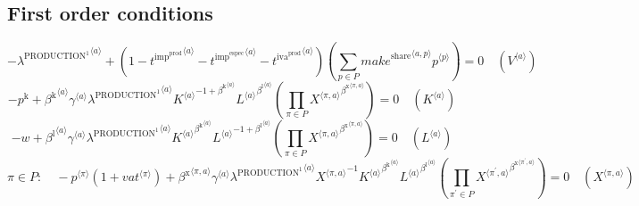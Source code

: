 \subsection{First order conditions}

\begin{equation}
-{\lambda^{\mathrm{PRODUCTION}^{\mathrm{1}}}}^{\langle a\rangle} + \left(1 - {t^{\mathrm{imp}^{\mathrm{prod}}}}^{\langle a\rangle} - {t^{\mathrm{imp}^{\mathrm{espec}}}}^{\langle a\rangle} - {t^{\mathrm{iva}^{\mathrm{prod}}}}^{\langle a\rangle}\right) \left(\sum_{p\in P} {{{m\!a\!k\!e}^{\mathrm{share}}}^{\langle a,p\rangle}} {{p}^{\langle p\rangle}}\right) = 0
 \quad \left({V}^{\langle a\rangle}\right)
\end{equation}
\begin{equation}
-p^{\mathrm{k}} + {{\beta^{\mathrm{k}}}^{\langle a\rangle}} {{\gamma}^{\langle a\rangle}} {{\lambda^{\mathrm{PRODUCTION}^{\mathrm{1}}}}^{\langle a\rangle}} {{{K}^{\langle a\rangle}}^{-1 + {\beta^{\mathrm{k}}}^{\langle a\rangle}}} {{{L}^{\langle a\rangle}}^{{\beta^{\mathrm{l}}}^{\langle a\rangle}}} \left(\prod_{\pi\in P} {{X}^{\langle \pi,a\rangle}}^{{\beta^{\mathrm{x}}}^{\langle \pi,a\rangle}}\right) = 0
 \quad \left({K}^{\langle a\rangle}\right)
\end{equation}
\begin{equation}
-w + {{\beta^{\mathrm{l}}}^{\langle a\rangle}} {{\gamma}^{\langle a\rangle}} {{\lambda^{\mathrm{PRODUCTION}^{\mathrm{1}}}}^{\langle a\rangle}} {{{K}^{\langle a\rangle}}^{{\beta^{\mathrm{k}}}^{\langle a\rangle}}} {{{L}^{\langle a\rangle}}^{-1 + {\beta^{\mathrm{l}}}^{\langle a\rangle}}} \left(\prod_{\pi\in P} {{X}^{\langle \pi,a\rangle}}^{{\beta^{\mathrm{x}}}^{\langle \pi,a\rangle}}\right) = 0
 \quad \left({L}^{\langle a\rangle}\right)
\end{equation}
\begin{equation}
\pi\in P\colon\quad -{{p}^{\langle \pi\rangle}} \left(1 + {{v\!a\!t}}^{\langle \pi\rangle}\right) + {{\beta^{\mathrm{x}}}^{\langle \pi,a\rangle}} {{\gamma}^{\langle a\rangle}} {{\lambda^{\mathrm{PRODUCTION}^{\mathrm{1}}}}^{\langle a\rangle}} {{X}^{\langle \pi,a\rangle}}^{-1} {{{K}^{\langle a\rangle}}^{{\beta^{\mathrm{k}}}^{\langle a\rangle}}} {{{L}^{\langle a\rangle}}^{{\beta^{\mathrm{l}}}^{\langle a\rangle}}} \left(\prod_{\pi^{\prime}\in P} {{X}^{\langle \pi^{\prime},a\rangle}}^{{\beta^{\mathrm{x}}}^{\langle \pi^{\prime},a\rangle}}\right) = 0
 \quad \left({X}^{\langle \pi,a\rangle}\right)
\end{equation}


